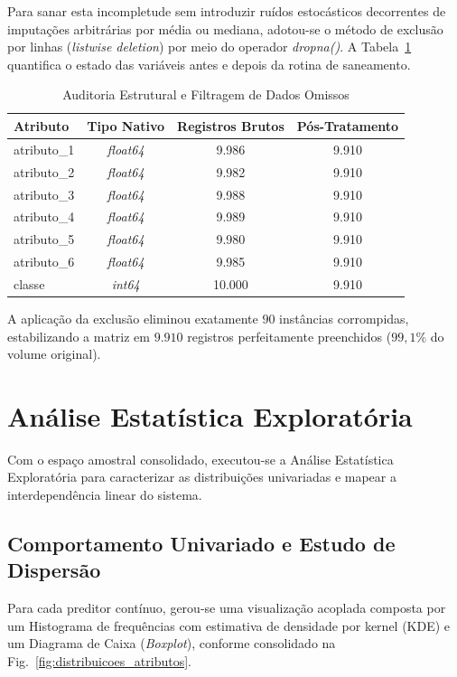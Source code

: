 \documentclass[journal]{IEEEtran}
\begin{document}
Para sanar esta incompletude sem introduzir ruídos estocásticos decorrentes de imputações arbitrárias por média ou mediana, adotou-se o método de exclusão por linhas (\textit{listwise deletion}) por meio do operador \textit{dropna()}. A Tabela~\ref{tab:auditoria_dados} quantifica o estado das variáveis antes e depois da rotina de saneamento.

\begin{table}[!t]
\renewcommand{\arraystretch}{1.3}
\caption{Auditoria Estrutural e Filtragem de Dados Omissos}
\label{tab:auditoria_dados}
\centering
\begin{tabular}{l|c|c|c}
\hline
\bfseries Atributo & \bfseries Tipo Nativo & \bfseries Registros Brutos & \bfseries Pós-Tratamento \\
\hline\hline
atributo\_1 & \textit{float64} & 9.986 & 9.910 \\
atributo\_2 & \textit{float64} & 9.982 & 9.910 \\
atributo\_3 & \textit{float64} & 9.988 & 9.910 \\
atributo\_4 & \textit{float64} & 9.989 & 9.910 \\
atributo\_5 & \textit{float64} & 9.980 & 9.910 \\
atributo\_6 & \textit{float64} & 9.985 & 9.910 \\
classe      & \textit{int64}   & 10.000 & 9.910 \\
\hline
\end{tabular}
\end{table}

A aplicação da exclusão eliminou exatamente $90$ instâncias corrompidas, estabilizando a matriz em $9.910$ registros perfeitamente preenchidos ($99,1\%$ do volume original).

\section{Análise Estatística Exploratória}
Com o espaço amostral consolidado, executou-se a Análise Estatística Exploratória para caracterizar as distribuições univariadas e mapear a interdependência linear do sistema.

\subsection{Comportamento Univariado e Estudo de Dispersão}
Para cada preditor contínuo, gerou-se uma visualização acoplada composta por um Histograma de frequências com estimativa de densidade por kernel (KDE) e um Diagrama de Caixa (\textit{Boxplot}), conforme consolidado na Fig.~\ref{fig:distribuicoes_atributos}.
\end{document}
